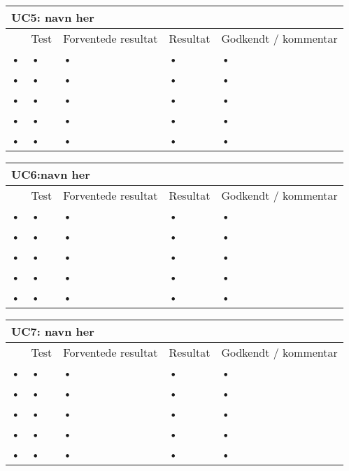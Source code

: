 \begin{tabular}{|l|l|l|l|l|}
\hline 
\multicolumn{5}{|l|}{\textbf{UC5: navn her}} \\ 
\hline 
& Test & Forventede resultat & Resultat & Godkendt / kommentar \\ 
\hline 
• & • & • & • & • \\ 
\hline 
• & • & • & • & • \\ 
\hline 
• & • & • & • & • \\ 
\hline 
• & • & • & • & • \\ 
\hline 
• & • & • & • & • \\ 
\hline 
\end{tabular} 

\begin{tabular}{|l|l|l|l|l|}
\hline 
\multicolumn{5}{|l|}{\textbf{UC6:navn her}} \\ 
\hline 
& Test & Forventede resultat & Resultat & Godkendt / kommentar \\ 
\hline 
• & • & • & • & • \\ 
\hline 
• & • & • & • & • \\ 
\hline 
• & • & • & • & • \\ 
\hline 
• & • & • & • & • \\ 
\hline 
• & • & • & • & • \\ 
\hline 
\end{tabular} 

\begin{tabular}{|l|l|l|l|l|}
\hline 
\multicolumn{5}{|l|}{\textbf{UC7: navn her}} \\ 
\hline 
& Test & Forventede resultat & Resultat & Godkendt / kommentar \\ 
\hline 
• & • & • & • & • \\ 
\hline 
• & • & • & • & • \\ 
\hline 
• & • & • & • & • \\ 
\hline 
• & • & • & • & • \\ 
\hline 
• & • & • & • & • \\ 
\hline 
\end{tabular} 